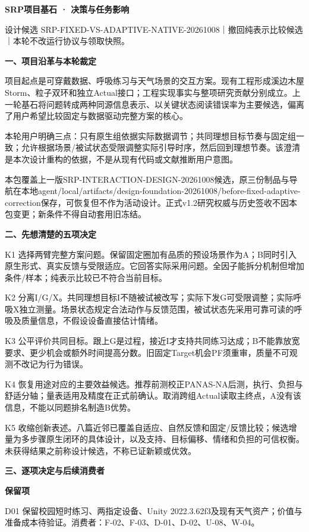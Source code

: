 \documentclass[11pt,a4paper]{article}
\newcommand{\reviewtitle}[1]{\begin{center}{\titlelatin\titlecjk\bfseries\fontsize{21}{28}\selectfont #1}\end{center}\vspace{8pt}}
\newcommand{\reviewsection}[1]{\par\Needspace{9\baselineskip}\vspace{10pt}\begin{center}{\titlelatin\titlecjk\bfseries\fontsize{14}{20}\selectfont #1}\end{center}}
\newcommand{\reviewsubsection}[1]{\par\Needspace{4\baselineskip}\vspace{4pt}\begin{center}{\titlelatin\titlecjk\bfseries\fontsize{12}{18}\selectfont #1}\end{center}}
\begin{document}
\reviewtitle{SRP项目基石 · 决策与任务影响}
设计候选 SRP-\allowbreak{}FIXED-\allowbreak{}VS-\allowbreak{}ADAPTIVE-\allowbreak{}NATIVE-\allowbreak{}20261008｜撤回纯表示比较候选｜本轮不改运行协议与领取快照。


\reviewsection{一、项目沿革与本轮裁定}
项目起点是可穿戴数据、呼吸练习与天气场景的交互方案。现有工程形成溪边木屋Storm、粒子双环和独立Actual接口；工程实现事实与整项研究贡献分别成立。上一轮基石将问题转成两种同源信息表示、以关键状态阅读错误率为主要候选，偏离了用户希望比较固定与数据驱动完整方案的核心。


本轮用户明确三点：只有原生组依据实际数据调节；共同理想目标节奏与固定组一致；允许根据场景/\allowbreak{}被试状态受限调整实际引导时序，然后回到理想节奏。该澄清是本次设计重构的依据，不是从现有代码或文献推断用户意图。


本包覆盖上一版SRP-\allowbreak{}INTERACTION-\allowbreak{}DESIGN-\allowbreak{}20261008候选，原三份制品与导航在本地agent/\allowbreak{}local/\allowbreak{}artifacts/\allowbreak{}design-\allowbreak{}foundation-\allowbreak{}20261008/\allowbreak{}before-\allowbreak{}fixed-\allowbreak{}adaptive-\allowbreak{}correction保存，可恢复但不作为活动设计。正式v1.2研究权威与历史签收不因本包变更；新条件不得自动套用旧冻结。


\reviewsection{二、先想清楚的五项决定}
K1 选择两臂完整方案问题。保留固定圈加有品质的预设场景作为A；B同时引入原生形式、真实反馈与受限适应。它回答实际采用问题。全因子能拆分机制但增加条件/\allowbreak{}样本；纯表示比较已不符合当前目标。


K2 分离I/\allowbreak{}G/\allowbreak{}X。共同理想目标I不随被试被改写；实际下发G可受限调整；实际呼吸X独立测量。场景状态规定合法动作与反馈范围，被试状态先采用可靠可读的呼吸及质量信息，不假设设备直接估计情绪。


K3 公平评价共同目标。跟上G是过程，接近I才支持共同练习达成；B不能靠放宽要求、更少机会或额外时间提高分数。旧固定Target机会PF须重审，质量不可观测不改记为行为错误。


K4 恢复用途对应的主要效益候选。推荐前测校正PANAS-\allowbreak{}NA后测，执行、负担与舒适分轴；量表适用及精度在正式前确认。取消跨组Actual读取主终点，A没有该信息，不能以同题排名制造B优势。


K5 收缩创新表述。八篇近邻已覆盖自适应、自然反馈和固定/\allowbreak{}反馈比较；候选增量为多步骤原生闭环的具体设计，以及支持、目标偏移、情绪和负担的可信权衡。未获得结果之前称设计候选，不称已证新颖或优效。


\reviewsection{三、逐项决定与后续消费者}
\reviewsubsection{3.1 保留项}
D01 保留校园短时练习、两指定设备、Unity 2022.3.62f3及现有天气资产；价值与准备成本待验证。消费者：F-\allowbreak{}02、F-\allowbreak{}03、D-\allowbreak{}01、D-\allowbreak{}02、U-\allowbreak{}08、W-\allowbreak{}04。
\end{document}
